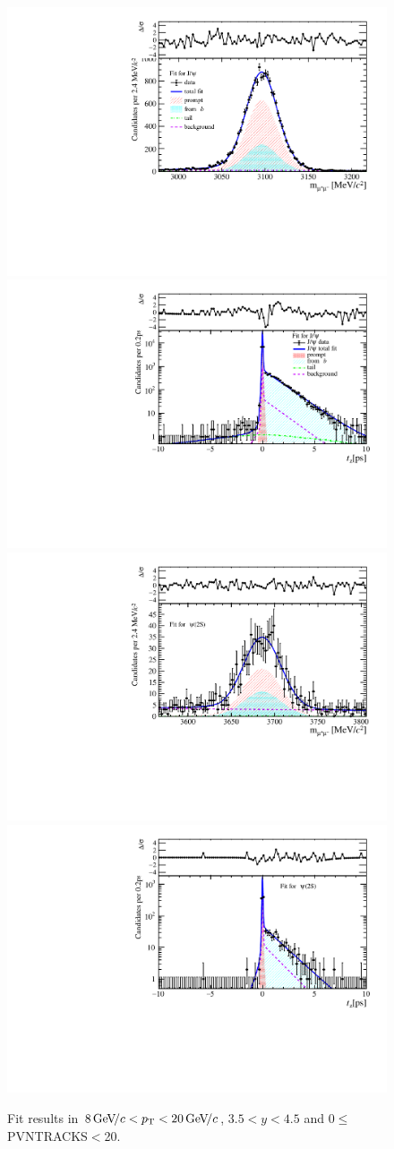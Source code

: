 \begin{figure}[H]
\begin{center}
\includegraphics[width=0.47\linewidth]{pdf/Jpsi/drawmass/n1y3pt5.pdf}
\includegraphics[width=0.47\linewidth]{pdf/Jpsi/2DFit/n1y3pt5.pdf}
\vspace*{-0.5cm}
\includegraphics[width=0.47\linewidth]{pdf/Psi2S/drawmass/n1y3pt5.pdf}
\includegraphics[width=0.47\linewidth]{pdf/Psi2S/2DFit/n1y3pt5.pdf}
\vspace*{-0.5cm}
\end{center}
\caption{Fit results in $8\text{\,Ge\kern -0.1em V\!/}c<p_{\mathrm{T}}<20\text{\,Ge\kern -0.1em V\!/}c$, $3.5<y<4.5$ and 0$\leq$PVNTRACKS$<$20.}
\label{Fitn1y3pt5}
\end{figure}
